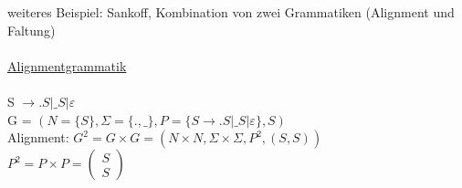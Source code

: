 weiteres Beispiel: Sankoff, Kombination von zwei Grammatiken (Alignment und Faltung)\\\\
\underline{Alignmentgrammatik}\\\\
S $\to .S | \_S | \varepsilon$\\
G = $(N = \{S\}, \Sigma = \{., \_\}, P=\{S \to .S | \_S | \varepsilon\}, S)$\\
Alignment: $G^2 = G \times G = (N \times N, \Sigma \times \Sigma, P^2, (S,S))$\\
$P^2 = P \times P = 
\left(
    \begin{array}{c}
      S \\
      S
    \end{array}
  \right)
$